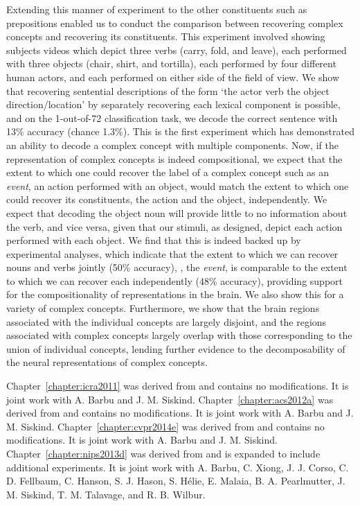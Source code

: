 Extending this manner of experiment to the other constituents such as
prepositions enabled us to conduct the comparison between recovering complex
concepts and recovering its constituents.
%
This experiment involved showing subjects videos which depict three verbs
(carry, fold, and leave), each performed with three objects (chair, shirt,
and tortilla), each performed by four different human actors, and each
performed on either side of the field of view.
%
We show that recovering sentential descriptions of the form `the actor verb
the object direction/location' by separately recovering each lexical
component is possible, and on the 1-out-of-72 classification task, we decode
the correct sentence with 13\% accuracy (chance 1.3\%).
%
This is the first experiment which has demonstrated an ability to decode a
complex concept with multiple components.
%
Now, if the representation of complex concepts is indeed compositional, we
expect that the extent to which one could recover the label of a complex
concept such as an \emph{event}, an action performed with an object, would
match the extent to which one could recover its constituents, the action and
the object, independently.
%
We expect that decoding the object noun will provide little to no information
about the verb, and vice versa, given that our stimuli, as designed, depict
each action performed with each object.
%
We find that this is indeed backed up by experimental analyses, which
indicate that the extent to which we can recover nouns and verbs jointly
(50\% accuracy), \ie, the \emph{event}, is comparable to the extent to which
we can recover each independently (48\% accuracy), providing support for the
compositionality of representations in the brain.
%
We also show this for a variety of complex concepts.
%
Furthermore, we show that the brain regions associated with the individual
concepts are largely disjoint, and the regions associated with complex
concepts largely overlap with those corresponding to the union of individual
concepts, lending further evidence to the decomposability of the neural
representations of complex concepts.


Chapter~\ref{chapter:icra2011} was derived from \cite{Siddharth2011} and contains
no modifications.
%
It is joint work with A. Barbu and J. M. Siskind.
%
Chapter~\ref{chapter:acs2012a} was derived from \cite{siddharth2012} and contains
no modifications.
%
It is joint work with A. Barbu and J. M. Siskind.
%
Chapter~\ref{chapter:cvpr2014e} was derived from
\cite{siddharth2013activityRecognition} and contains no modifications.
%
It is joint work with A. Barbu and J. M. Siskind.
%
Chapter~\ref{chapter:nips2013d} was derived from
\cite{barbu2013compositionality} and is expanded to include additional
experiments.
%
It is joint work with A. Barbu, C. Xiong, J. J. Corso,
C. D. Fellbaum, C. Hanson, S. J. Hason, S. H\'{e}lie, E. Malaia,
B. A. Pearlmutter, J. M. Siskind, T. M. Talavage, and R. B. Wilbur.
